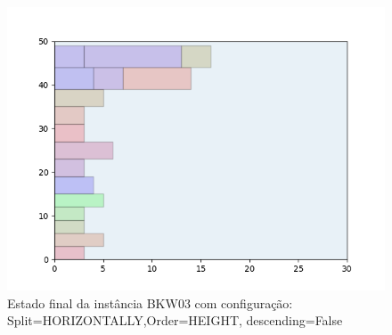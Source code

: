 \begin{figure}[H]
    \centering
    \caption[]{Estado final da instância BKW03 com configuração: Split=HORIZONTALLY,Order=HEIGHT, descending=False}
    \label{fig:bkw03-horizontally-height-false}
    \includegraphics[scale=0.5]{output/figures/bkw/bkw03/horizontally/height/false/00}
\end{figure}